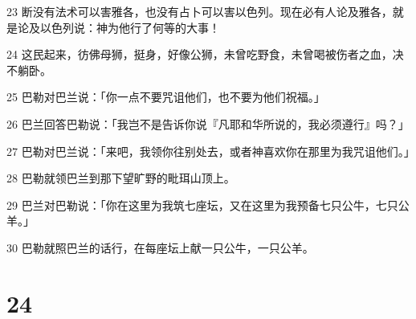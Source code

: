 \par 23 断没有法术可以害雅各，也没有占卜可以害以色列。现在必有人论及雅各，就是论及以色列说：神为他行了何等的大事！
\par 24 这民起来，彷佛母狮，挺身，好像公狮，未曾吃野食，未曾喝被伤者之血，决不躺卧。
\par 25 巴勒对巴兰说：「你一点不要咒诅他们，也不要为他们祝福。」
\par 26 巴兰回答巴勒说：「我岂不是告诉你说『凡耶和华所说的，我必须遵行』吗？」
\par 27 巴勒对巴兰说：「来吧，我领你往别处去，或者神喜欢你在那里为我咒诅他们。」
\par 28 巴勒就领巴兰到那下望旷野的毗珥山顶上。
\par 29 巴兰对巴勒说：「你在这里为我筑七座坛，又在这里为我预备七只公牛，七只公羊。」
\par 30 巴勒就照巴兰的话行，在每座坛上献一只公牛，一只公羊。

\chapter{24}

